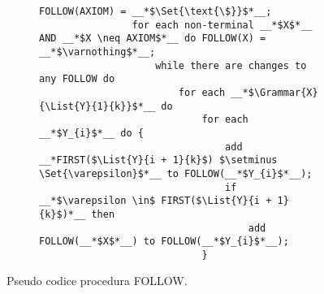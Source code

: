 \documentclass{subfiles}
\begin{document}
\begin{figure}[h!]
    \centering
    \begin{subfigure}[b]{0.7125\textwidth}
        \begin{lstlisting}[language = PSEUDO]
                FOLLOW(AXIOM) = __*$\Set{\text{\$}}$*__;
                for each non-terminal __*$X$*__ AND __*$X \neq AXIOM$*__ do FOLLOW(X) = __*$\varnothing$*__;
                    while there are changes to any FOLLOW do 
                        for each __*$\Grammar{X}{\List{Y}{1}{k}}$*__ do 
                            for each __*$Y_{i}$*__ do {
                                add __*FIRST($\List{Y}{i + 1}{k}$) $\setminus \Set{\varepsilon}$*__ to FOLLOW(__*$Y_{i}$*__);
                                if __*$\varepsilon \in$ FIRST($\List{Y}{i + 1}{k}$)*__ then
                                    add FOLLOW(__*$X$*__) to FOLLOW(__*$Y_{i}$*__);
                            }
            \end{lstlisting}
    \end{subfigure}
    \caption{Pseudo codice procedura FOLLOW.}
    \label{fig:4}
\end{figure}
\end{document}

